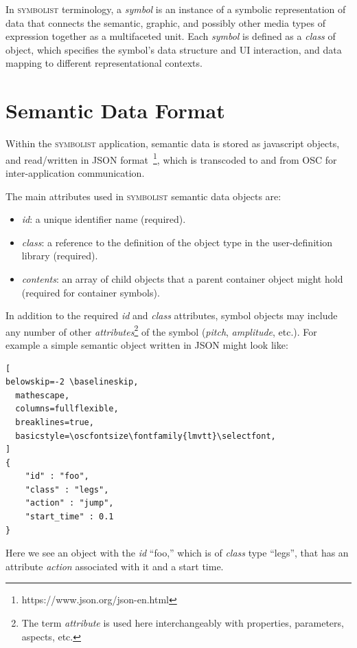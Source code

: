 \documentclass{article}
\def\symbolist{\textsc{symbolist}\xspace}
\def\oscfontsize{\tiny}
\begin{document}
In \symbolist terminology, a \textit{symbol} is an instance of a symbolic representation of data that connects the semantic, graphic, and possibly other media types of expression together as a multifaceted unit.
Each \textit{symbol} is defined as a \textit{class} of object, which specifies the symbol's data structure and UI interaction, and data mapping to different representational contexts.

\section{Semantic Data Format}\label{sec:format}

Within the \symbolist application, semantic data is stored as javascript objects, and read/written in JSON format~\footnote{https://www.json.org/json-en.html}, which is transcoded to and from OSC for inter-application communication.

The main attributes used in \symbolist semantic data objects are:

\begin{itemize}\itemsep0pt 
\item \textit{id}: a unique identifier name (required).
\item \textit{class}: a reference to the definition of the object type in the user-definition library (required).
\item \textit{contents}: an array of child objects that a parent container object might hold (required for container symbols).
\end{itemize}

In addition to the required \textit{id} and \textit{class} attributes, symbol objects may include any number of other \textit{attributes}\footnote{The term \textit{attribute} is used here interchangeably with properties, parameters, aspects, etc.} of the symbol (\textit{pitch}, \textit{amplitude}, etc.). For example a simple semantic object written in JSON might look like:

\begin{lstlisting}[
belowskip=-2 \baselineskip,
  mathescape,
  columns=fullflexible,
  breaklines=true,
  basicstyle=\oscfontsize\fontfamily{lmvtt}\selectfont,
]
{
    "id" : "foo",
    "class" : "legs",
    "action" : "jump",
    "start_time" : 0.1
}
\end{lstlisting}

\noindent
Here we see an object with the \textit{id} ``foo,'' which is of \textit{class} type ``legs'', that has an attribute \textit{action} associated with it and a start time.
\end{document}
